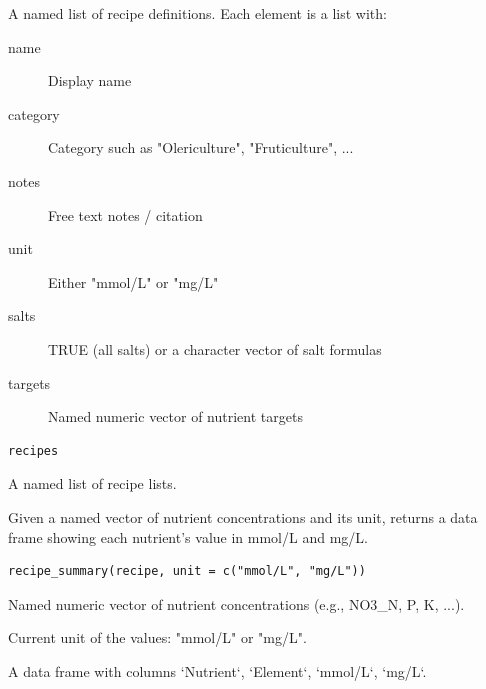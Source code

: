 \documentclass[a4paper]{book}
\begin{document}
%
\begin{Description}
A named list of recipe definitions. Each element is a list with:
\begin{description}

\item[name] Display name
\item[category] Category such as "Olericulture", "Fruticulture", ...
\item[notes] Free text notes / citation
\item[unit] Either "mmol/L" or "mg/L"
\item[salts] TRUE (all salts) or a character vector of salt formulas
\item[targets] Named numeric vector of nutrient targets

\end{description}

\end{Description}
%
\begin{Usage}
\begin{verbatim}
recipes
\end{verbatim}
\end{Usage}
%
\begin{Format}
A named list of recipe lists.
\end{Format}
%
\begin{Description}
Given a named vector of nutrient concentrations and its unit,
returns a data frame showing each nutrient's value in mmol/L and mg/L.
\end{Description}
%
\begin{Usage}
\begin{verbatim}
recipe_summary(recipe, unit = c("mmol/L", "mg/L"))
\end{verbatim}
\end{Usage}
%
\begin{Arguments}
\begin{ldescription}
\item[\code{recipe}] Named numeric vector of nutrient concentrations (e.g., NO3\_N, P, K, ...).

\item[\code{unit}] Current unit of the values: "mmol/L" or "mg/L".
\end{ldescription}
\end{Arguments}
%
\begin{Value}
A data frame with columns `Nutrient`, `Element`, `mmol/L`, `mg/L`.
\end{Value}
\end{document}
